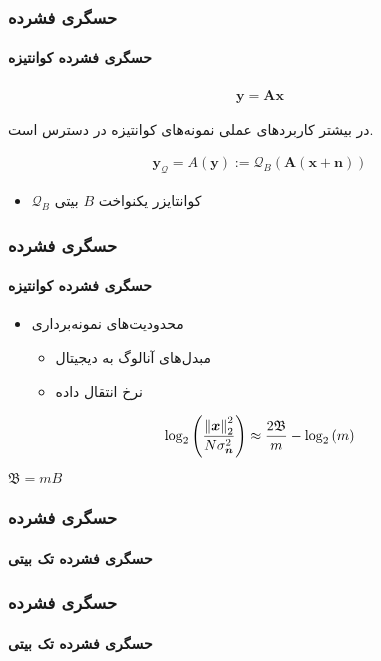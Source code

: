 \begin{frame}
\frametitle{حسگری فشرده}
\framesubtitle{حسگری فشرده کوانتیزه}
\begin{align}
\label{eq2}
\bm{y}=\bm{A}\bm{x}
\end{align}
\pause
\begin{block}{}
\centering
در بیشتر کاربرد‌های عملی نمونه‌های کوانتیزه در دسترس است.
\end{block}

\begin{align}
\label{eq3}
\bm{y}_{\mathcal{Q}} =A(\bm{y}):= \mathcal{Q}_{B}\left(\bm{A}(\bm{x}+\bm{n})\right)
\end{align}
\begin{itemize}
\item{$\mathcal{Q}_{B}$
کوانتایزر یکنواخت
$B$
بیتی}
\end{itemize}

\end{frame}

\begin{frame}
\frametitle{حسگری فشرده}
\framesubtitle{حسگری فشرده کوانتیزه}
\begin{itemize}
\item{محدودیت‌های نمونه‌برداری}
\begin{itemize}
\item{مبدل‌های آنالوگ به دیجیتال}
\item{نرخ انتقال داده}
\end{itemize}
\end{itemize}

\pause

\begin{block}{}
\cite{laska2012regime}
\begin{align}
\label{eq5}
\log_{2}\left( \dfrac{\left\lVert\bm{x}\right\rVert_{2}^{2}}{N \sigma^{2}_{\bm{n}}}\right)\approx \dfrac{2\mathfrak{B}}{m}-\log_{2}\left(m\right)
\end{align}
\end{block}
\begin{center}
$\mathfrak{B}=mB$
\end{center}


\end{frame}


\begin{frame}
\frametitle{حسگری فشرده}
\framesubtitle{حسگری فشرده تک بیتی}
\end{frame}

\begin{frame}
\frametitle{حسگری فشرده}
\framesubtitle{حسگری فشرده تک بیتی}
\end{frame}

